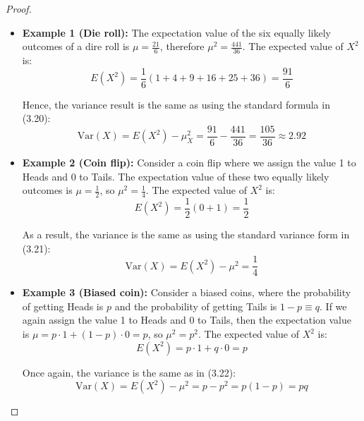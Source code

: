 \begin{proof}
    \hfill
    \begin{itemize}
        \item \textbf{Example 1 (Die roll):} The expectation value of the six equally likely outcomes
            of a dire roll is $\mu = \frac{21}{6}$, therefore $\mu^2 = \frac{441}{36}$. The expected value
            of $X^2$ is:
            \[
                E(X^2) = \frac{1}{6}(1 + 4 + 9 + 16 + 25 + 36) = \frac{91}{6}
            \] 

            Hence, the variance result is the same as using the standard formula in (3.20): 
            \[
                \text{Var}(X) = E(X^2) - \mu_X^2 = \frac{91}{6} - \frac{441}{36} = \frac{105}{36} \approx 2.92
            \] 

        \item \textbf{Example 2 (Coin flip):} Consider a coin flip where we assign the value 1 to Heads
            and 0 to Tails. The expectation value of these two equally likely outcomes is $\mu = \frac{1}{2}$,
            so $\mu^2 = \frac{1}{4}$. The expected value of $X^2$ is:
            \[
                E(X^2) = \frac{1}{2} (0 + 1) = \frac{1}{2}
            \] 

            As a result, the variance is the same as using the standard variance form in (3.21):
            \[
                \text{Var}(X) = E(X^2) - \mu^2 = \frac{1}{4}
            \] 

        \item \textbf{Example 3 (Biased coin):} Consider a biased coins, where the probability of getting
            Heads is $p$ and the probability of getting Tails is $1 - p \equiv q$. If we again
            assign the value 1 to Heads and 0 to Tails, then the expectation value is 
            $\mu = p \cdot 1 + (1 - p) \cdot 0 = p$, so $\mu^2 = p^2$. The expected value
            of $X^2$ is:
             \[
                 E(X^2) = p \cdot 1 + q \cdot 0 = p
            \] 

            Once again, the variance is the same as in (3.22):
            \[
                \text{Var}(X) = E(X^2) - \mu^2 = p - p^2 = p(1 - p) = pq
            \] 
    \end{itemize}
\end{proof}

